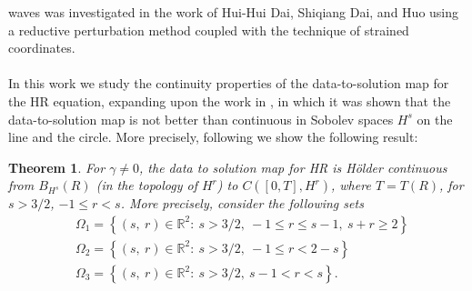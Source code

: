 \documentclass[12pt,reqno]{amsart}
\numberwithin{equation}{section}  %
\numberwithin{figure}{section}
\newcommand{\rr}{\mathbb{R}}
\newtheorem{theorem}{Theorem}[section]
\begin{document}
waves was investigated in the work of Hui-Hui Dai, 
Shiqiang Dai, and Huo \cite{Dai_2000_Head-on-collisi} using a reductive 
perturbation method coupled with the technique of strained coordinates. 
\\
\\
In this work we study the continuity properties of the data-to-solution map for
the HR 
equation, expanding upon the work in \cite{Karapetyan:2010fk}, in which it was
shown that the data-to-solution map is not better than continuous in Sobolev
spaces $H^{s}$ on the line
and the circle. More precisely, following \cite{Chen:2011fk} we show the
following result:
%
%
\begin{theorem}
For $\gamma \neq 0$, the
data to solution map for HR is H\"older continuous from $B_{H^{s}}(R)$ (in
the topology of $H^{r}$) to $C([0, T], H^{r})$, where $T = T(R)$, for $s >
3/2$, $-1 \le r < s$. More
precisely, consider the following sets 
%
  \begin{equation*}
  \begin{split}
      & \Omega_{1} = \left\{ (s, \ r) \in \rr^{2}:
     \ s>3/2, \ -1 \le r \le s-1, \ s + r \ge 2  \right\}
    \\
    & \Omega_{2} = \left\{ (s, \ r) \in \rr^{2}:
     \ s>3/2, \ -1 \le r < 2-s \right\}
    \\
    & \Omega_{3} = \left\{ (s, \ r) \in \rr^{2}:
    \  s>3/2, \  s-1 < r < s  \right\}.
    \end{split}
\end{equation*}
\label{thm:main-thm}
\end{theorem}
%
\begin{center}
\end{center}
\end{document}
